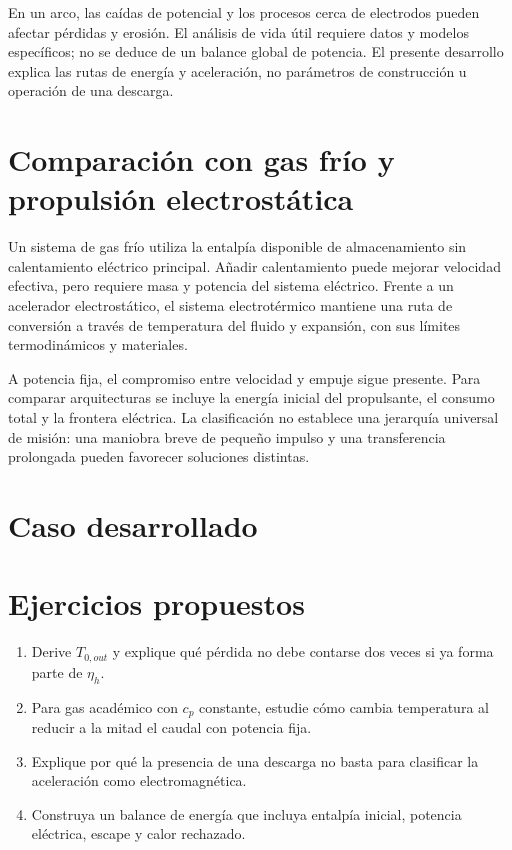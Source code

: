 En un arco, las caídas de potencial y los procesos cerca de electrodos pueden afectar pérdidas y erosión. El análisis de vida útil requiere datos y modelos específicos; no se deduce de un balance global de potencia. El presente desarrollo explica las rutas de energía y aceleración, no parámetros de construcción u operación de una descarga.
\section{Comparación con gas frío y propulsión electrostática}
Un sistema de gas frío utiliza la entalpía disponible de almacenamiento sin calentamiento eléctrico principal. Añadir calentamiento puede mejorar velocidad efectiva, pero requiere masa y potencia del sistema eléctrico. Frente a un acelerador electrostático, el sistema electrotérmico mantiene una ruta de conversión a través de temperatura del fluido y expansión, con sus límites termodinámicos y materiales.

A potencia fija, el compromiso entre velocidad y empuje sigue presente. Para comparar arquitecturas se incluye la energía inicial del propulsante, el consumo total y la frontera eléctrica. La clasificación no establece una jerarquía universal de misión: una maniobra breve de pequeño impulso y una transferencia prolongada pueden favorecer soluciones distintas.
\section{Caso desarrollado}

\section{Ejercicios propuestos}
\begin{enumerate}
\item Derive $T_{0,out}$ y explique qué pérdida no debe contarse dos veces si ya forma parte de $\eta_h$.
\item Para gas académico con $c_p$ constante, estudie cómo cambia temperatura al reducir a la mitad el caudal con potencia fija.
\item Explique por qué la presencia de una descarga no basta para clasificar la aceleración como electromagnética.
\item Construya un balance de energía que incluya entalpía inicial, potencia eléctrica, escape y calor rechazado.
\end{enumerate}


\studiumchaptercheck
